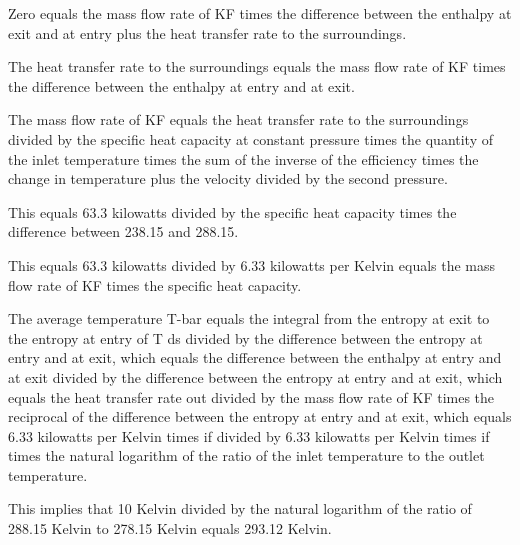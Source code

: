 Zero equals the mass flow rate of KF times the difference between the enthalpy at exit and at entry plus the heat transfer rate to the surroundings.

The heat transfer rate to the surroundings equals the mass flow rate of KF times the difference between the enthalpy at entry and at exit.

The mass flow rate of KF equals the heat transfer rate to the surroundings divided by the specific heat capacity at constant pressure times the quantity of the inlet temperature times the sum of the inverse of the efficiency times the change in temperature plus the velocity divided by the second pressure.

This equals 63.3 kilowatts divided by the specific heat capacity times the difference between 238.15 and 288.15.

This equals 63.3 kilowatts divided by 6.33 kilowatts per Kelvin equals the mass flow rate of KF times the specific heat capacity.

The average temperature T-bar equals the integral from the entropy at exit to the entropy at entry of T ds divided by the difference between the entropy at entry and at exit, which equals the difference between the enthalpy at entry and at exit divided by the difference between the entropy at entry and at exit, which equals the heat transfer rate out divided by the mass flow rate of KF times the reciprocal of the difference between the entropy at entry and at exit, which equals 6.33 kilowatts per Kelvin times if divided by 6.33 kilowatts per Kelvin times if times the natural logarithm of the ratio of the inlet temperature to the outlet temperature.

This implies that 10 Kelvin divided by the natural logarithm of the ratio of 288.15 Kelvin to 278.15 Kelvin equals 293.12 Kelvin.